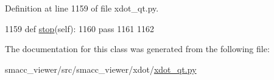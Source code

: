 Definition at line 1159 of file xdot\+\_\+qt.\+py.


\begin{DoxyCode}
1159     \textcolor{keyword}{def }\hyperlink{classsmacc__viewer_1_1xdot_1_1xdot__qt_1_1NoAnimation_ac48d3a9ed84dc69f1770288717e15947}{stop}(self):
1160         \textcolor{keywordflow}{pass}
1161 
1162 
\end{DoxyCode}


The documentation for this class was generated from the following file\+:\begin{DoxyCompactItemize}
\item 
smacc\+\_\+viewer/src/smacc\+\_\+viewer/xdot/\hyperlink{xdot__qt_8py}{xdot\+\_\+qt.\+py}\end{DoxyCompactItemize}
